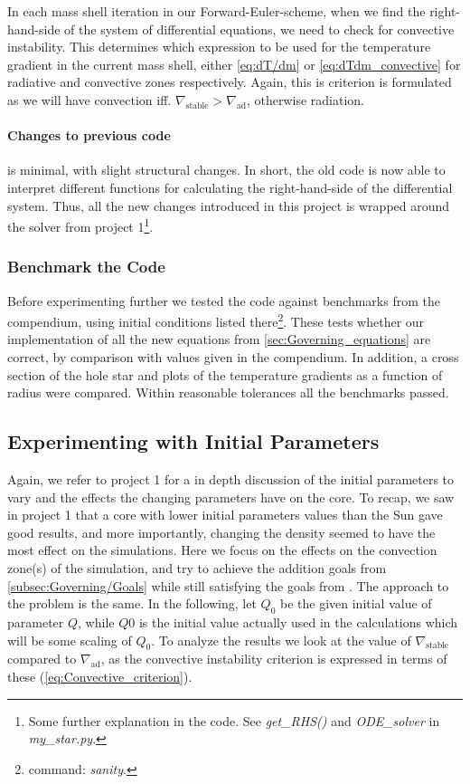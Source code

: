 \documentclass[11pt,a4paper,twocolumn,titlepage]{article}
\newcommand{\nablastb}
{
\nabla_{\text{stable}}
}
\newcommand{\nablaad}
{
\nabla_{\text{ad}}
}
\begin{document}
In each mass shell iteration in our Forward-Euler-scheme, when we find the right-hand-side of the system of differential equations, we need to check for convective instability. This determines which expression to be used for the temperature gradient in the current mass shell, either \cref{eq:dT/dm} or \cref{eq:dTdm_convective} for radiative and convective zones respectively. Again, this is criterion is formulated as we will have convection iff. $\nablastb>\nablaad$, otherwise radiation.

\paragraph{Changes to previous code} is minimal, with slight structural changes. In short, the old code is now able to interpret different functions for calculating the right-hand-side of the differential system. Thus, all the new changes introduced in this project is wrapped around the solver from project 1\footnote{Some further explanation in the code. See \textit{get\_RHS()} and \textit{ODE\_solver} in \textit{my\_star.py}.}.

\subsubsection{Benchmark the Code}\label{subsub:Method/Sanity}
Before experimenting further we tested the code against benchmarks from the compendium, using initial conditions listed there\footnote{command: \textit{sanity}.}. These tests whether our implementation of all the new equations from \cref{sec:Governing_equations} are correct, by comparison with values given in the compendium. In addition, a cross section of the hole star and plots of the temperature gradients as a function of radius were compared. Within reasonable tolerances all the benchmarks passed.

\subsection{Experimenting with Initial Parameters}\label{subsec:Method/Experimenting}
Again, we refer to project 1 for a in depth discussion of the initial parameters to vary and the effects the changing parameters have on the core. To recap, we saw in project 1 that a core with lower initial parameters values than the Sun gave good results, and more importantly, changing the density seemed to have the most effect on the simulations. Here we focus on the effects on the convection zone(s) of the simulation, and try to achieve the addition goals from \cref{subsec:Governing/Goals} while still satisfying the goals from \cite{Project1}. The approach to the problem is the same. In the following, let $Q_0$ be the given initial value of parameter $Q$, while $Q0$ is the initial value actually used in the calculations which will be some scaling of $Q_0$. To analyze the results we look at the value of $\nablastb$ compared to $\nablaad$, as the convective instability criterion is expressed in terms of these (\cref{eq:Convective_criterion}). 
\end{document}
